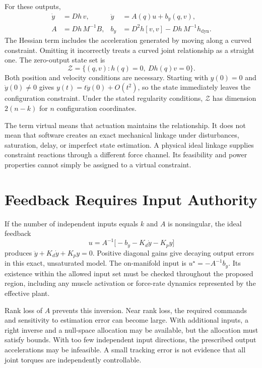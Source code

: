 For these outputs,
\begin{equation}
\begin{aligned}
\dot y&=Dh\,v,&\ddot y&=A(q)u+b_y(q,v),\\
A&=Dh\,M^{-1}B,&b_y&=D^2h[v,v]-Dh\,M^{-1}h_{\mathrm{dyn}} .
\end{aligned}
\end{equation}
The Hessian term includes the acceleration generated by moving along a curved constraint. Omitting it incorrectly treats a curved joint relationship as a straight one. The zero-output state set is
\begin{equation}
\mathcal Z=\{(q,v):h(q)=0,\ Dh(q)v=0\}.
\end{equation}
Both position and velocity conditions are necessary. Starting with $y(0)=0$ and $\dot y(0)\ne0$ gives $y(t)=t\dot y(0)+O(t^2)$, so the state immediately leaves the configuration constraint. Under the stated regularity conditions, $\mathcal Z$ has dimension $2(n-k)$ for $n$ configuration coordinates.

The term virtual means that actuation maintains the relationship. It does not mean that software creates an exact mechanical linkage under disturbances, saturation, delay, or imperfect state estimation. A physical ideal linkage supplies constraint reactions through a different force channel. Its feasibility and power properties cannot simply be assigned to a virtual constraint.

\section{Feedback Requires Input Authority}

If the number of independent inputs equals $k$ and $A$ is nonsingular, the ideal feedback
\begin{equation}
u=A^{-1}\bigl[-b_y-K_d\dot y-K_p y\bigr]
\end{equation}
produces $\ddot y+K_d\dot y+K_p y=0$. Positive diagonal gains give decaying output errors in this exact, unsaturated model. The on-manifold input is $u^\star=-A^{-1}b_y$. Its existence within the allowed input set must be checked throughout the proposed region, including any muscle activation or force-rate dynamics represented by the effective plant.

Rank loss of $A$ prevents this inversion. Near rank loss, the required commands and sensitivity to estimation error can become large. With additional inputs, a right inverse and a null-space allocation may be available, but the allocation must satisfy bounds. With too few independent input directions, the prescribed output accelerations may be infeasible. A small tracking error is not evidence that all joint torques are independently controllable.

